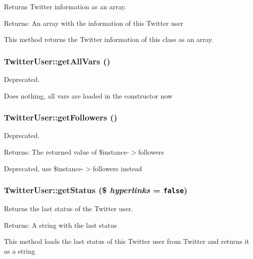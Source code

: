 Returns Twitter information as an array. 

\begin{Desc}
\item[Returns:]An array with the information of this Twitter user\end{Desc}
This method returns the Twitter information of this class as an array. \hypertarget{class_twitter_user_3f9ce8a4f4440b619615becf76b43895}{
\subsubsection[{getAllVars}]{\setlength{\rightskip}{0pt plus 5cm}TwitterUser::getAllVars ()}}
\label{class_twitter_user_3f9ce8a4f4440b619615becf76b43895}


Deprecated. 

Does nothing, all vars are loaded in the constructor now \hypertarget{class_twitter_user_c1171d93ebf6f48e8440b9e8575252df}{
\subsubsection[{getFollowers}]{\setlength{\rightskip}{0pt plus 5cm}TwitterUser::getFollowers ()}}
\label{class_twitter_user_c1171d93ebf6f48e8440b9e8575252df}


Deprecated. 

\begin{Desc}
\item[Returns:]The returned value of \$instance-$>$followers\end{Desc}
Deprecated, use \$instance-$>$followers instead \hypertarget{class_twitter_user_c9d80058de5952727ecf7f58448d266b}{
\subsubsection[{getStatus}]{\setlength{\rightskip}{0pt plus 5cm}TwitterUser::getStatus (\$ {\em hyperlinks} = {\tt false})}}
\label{class_twitter_user_c9d80058de5952727ecf7f58448d266b}


Returns the last status of the Twitter user. 

\begin{Desc}
\item[Returns:]A string with the last status\end{Desc}
This method loads the last status of this Twitter user from Twitter and returns it as a string 


